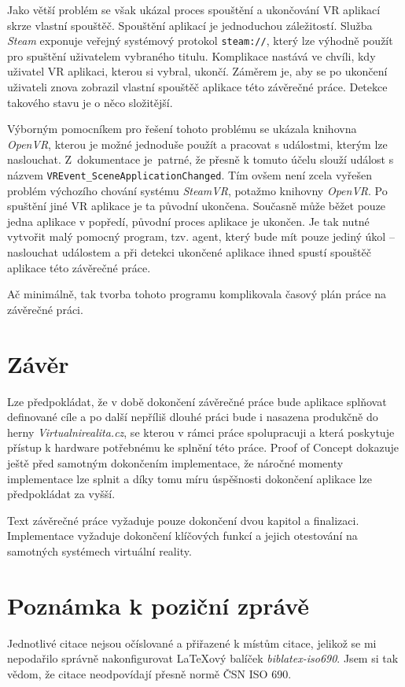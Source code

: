 \documentclass[12pt, a4paper]{article}
\begin{document}
Jako větší problém se však ukázal proces spouštění a ukončování VR aplikací skrze vlastní spouštěč. Spouštění aplikací je jednoduchou záležitostí. Služba \textit{Steam} exponuje veřejný systémový protokol \texttt{steam://}, který lze výhodně použít pro spuštění uživatelem vybraného titulu.
Komplikace nastává ve chvíli, kdy uživatel VR aplikaci, kterou si vybral, ukončí. Záměrem je, aby se po ukončení uživateli znova zobrazil vlastní spouštěč aplikace této závěrečné práce. Detekce takového stavu je o něco složitější.

Výborným pomocníkem pro řešení tohoto problému se ukázala knihovna \textit{OpenVR}, kterou je možné jednoduše použít a pracovat s událostmi, kterým lze naslouchat. Z~dokumentace je~patrné, že přesně k tomuto účelu slouží událost s názvem \texttt{VREvent\_SceneApplicationChanged}.
Tím ovšem není zcela vyřešen problém výchozího chování systému \textit{SteamVR}, potažmo knihovny \textit{OpenVR}. Po spuštění jiné VR aplikace je ta původní ukončena. Současně může běžet pouze jedna aplikace v popředí, původní proces aplikace je ukončen. Je tak nutné vytvořit malý pomocný program, tzv. agent, který bude mít pouze jediný úkol -- naslouchat událostem a při detekci ukončené aplikace ihned spustí spouštěč aplikace této závěrečné práce.

Ač minimálně, tak tvorba tohoto programu komplikovala časový plán práce na závěrečné práci.

\section{Závěr}

Lze předpokládat, že v době dokončení závěrečné práce bude aplikace splňovat definované cíle a po další nepříliš dlouhé práci bude i nasazena produkčně do herny \textit{Virtualnirealita.cz}, se kterou v rámci práce spolupracuji a která poskytuje přístup k hardware potřebnému ke splnění této práce. Proof of Concept dokazuje ještě před samotným dokončením implementace, že náročné momenty implementace lze splnit a díky tomu míru úspěšnosti dokončení aplikace lze předpokládat za vyšší.

Text závěrečné práce vyžaduje pouze dokončení dvou kapitol a finalizaci. Implementace vyžaduje dokončení klíčových funkcí a jejich otestování na samotných systémech virtuální reality.

\newpage

\begingroup
\raggedright

\nocite{*}
\printbibliography[title={Zdroje}]
\endgroup

\section*{Poznámka k poziční zprávě}

Jednotlivé citace nejsou očíslované a přiřazené k místům citace, jelikož se mi nepodařilo správně nakonfigurovat LaTeXový balíček \textit{biblatex-iso690}. Jsem si tak vědom, že citace neodpovídají přesně normě ČSN ISO 690.
\end{document}
